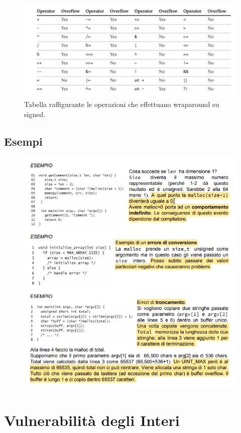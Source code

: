\begin{figure}[H]
    \centering
    \includegraphics[width=12cm, keepaspectratio]{capitoli/secure_coding/img/cap_2/wraparound_signed.png}
    \caption{Tabella raffigurante le operazioni che effettuano wraparound su signed.}
\end{figure}

\subsection{Esempi}

\begin{figure}[H]
    \centering
    \includegraphics[width=12cm, keepaspectratio]{capitoli/secure_coding/img/cap_2/esempi.png}
\end{figure}

\section{Vulnerabilità degli Interi}

